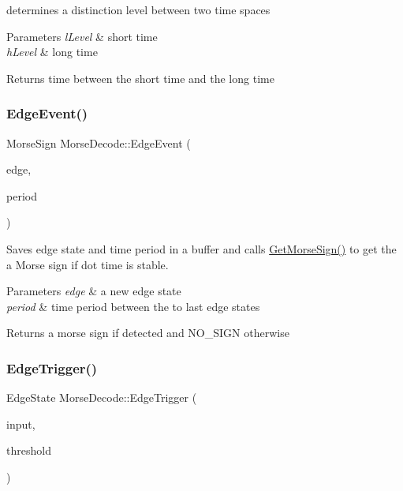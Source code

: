 determines a distinction level between two time spaces 


\begin{DoxyParams}{Parameters}
{\em l\+Level} & short time \\
\hline
{\em h\+Level} & long time \\
\hline
\end{DoxyParams}
\begin{DoxyReturn}{Returns}
time between the short time and the long time 
\end{DoxyReturn}
\mbox{\label{classMorseDecode_ad02e7621b4c4e8a5b766dc4f4f31fa05}} 
\subsubsection{\texorpdfstring{Edge\+Event()}{EdgeEvent()}}
{\footnotesize\ttfamily Morse\+Sign Morse\+Decode\+::\+Edge\+Event (\begin{DoxyParamCaption}\item[{Morse\+::\+Edge\+State}]{edge,  }\item[{double}]{period }\end{DoxyParamCaption})\hspace{0.3cm}{\ttfamily [private]}}



Saves edge state and time period in a buffer and calls \hyperlink{classMorseDecode_aff88997ef0a7621027bab01be18473a0}{Get\+Morse\+Sign()} to get the a Morse sign if dot time is stable. 


\begin{DoxyParams}{Parameters}
{\em edge} & a new edge state \\
\hline
{\em period} & time period between the to last edge states \\
\hline
\end{DoxyParams}
\begin{DoxyReturn}{Returns}
a morse sign if detected and N\+O\+\_\+\+S\+I\+GN otherwise 
\end{DoxyReturn}
\mbox{\label{classMorseDecode_a64943543f9a4f2d7a567a59239563adf}} 
\subsubsection{\texorpdfstring{Edge\+Trigger()}{EdgeTrigger()}}
{\footnotesize\ttfamily Edge\+State Morse\+Decode\+::\+Edge\+Trigger (\begin{DoxyParamCaption}\item[{double}]{input,  }\item[{double}]{threshold }\end{DoxyParamCaption})\hspace{0.3cm}{\ttfamily [private]}}



